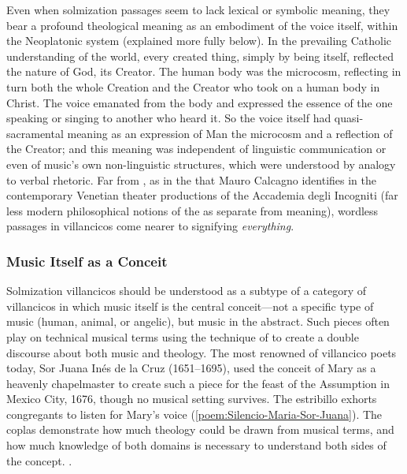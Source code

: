 Even when solmization passages seem to lack lexical or symbolic meaning, they
bear a profound theological meaning as an embodiment of the voice itself,
within the Neoplatonic system (explained more fully below).
In the prevailing Catholic understanding of the world, every created thing,
simply by being itself, reflected the nature of God, its Creator.
The human body was the microcosm, reflecting in turn both the whole Creation
and the Creator who took on a human body in Christ.
The voice emanated from the body and expressed the essence of the one speaking
or singing to another who heard it.
So the voice itself had quasi-sacramental meaning as an expression of Man the
microcosm and a reflection of the Creator; and this meaning was independent of
linguistic communication or even of music's own non-linguistic structures,
which were understood by analogy to verbal rhetoric.
Far from , as in the  that Mauro Calcagno identifies in the contemporary Venetian theater
productions of the Accademia degli Incogniti (far less modern philosophical
notions of the  as separate from meaning), wordless
passages in villancicos come nearer to signifying \emph{everything}.%

\subsubsection{Music Itself as a Conceit}

Solmization villancicos should be understood as a subtype of a category of
villancicos in which music itself is the central conceit---not a specific type
of music (human, animal, or angelic), but music in the abstract.
Such pieces often play on technical musical terms using the technique of
 to create a double discourse about both music and theology.
The most renowned of villancico poets today, Sor Juana Inés de la Cruz
(1651--1695), used the conceit of Mary as a heavenly chapelmaster to create
such a piece for the feast of the Assumption in Mexico City, 1676, though no
musical setting survives.%
    \Autocite[, ]{SorJuana:VC} 
The estribillo exhorts congregants to listen for Mary's voice
(\cref{poem:Silencio-Maria-Sor-Juana}).
The coplas demonstrate how much theology could be drawn from musical terms, and
how much knowledge of both domains is necessary to understand both sides of the
concept.%
    \Autocite{Stevenson:SorJuanaMusicalRapports}.


